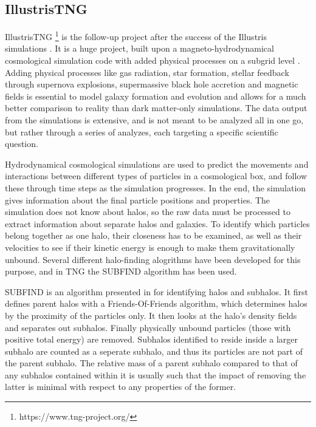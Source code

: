 \subsection{IllustrisTNG}
IllustrisTNG \footnote{https://www.tng-project.org/} is the follow-up project after the success of the Illustris simulations \parencite{Springel2017, Pillepich2017,Naiman2018, Nelson2017, Marinacci2018}. It is a huge project, built upon a magneto-hydrodynamical cosmological simulation code with added physical processes on a subgrid level \parencite{Weinberger2016}. Adding physical processes like gas radiation, star formation, stellar feedback through supernova explosions, supermassive black hole accretion and magnetic fields is essential to model galaxy formation and evolution and allows for a much better comparison to reality than dark matter-only simulations. The data output from the simulations is extensive, and is not meant to be analyzed all in one go, but rather through a series of analyzes, each targeting a specific scientific question. 

Hydrodynamical cosmological simulations are used to predict the movements and interactions between different types of particles in a cosmological box, and follow these through time steps as the simulation progresses. In the end, the simulation gives information about the final particle positions and properties. The simulation does not know about halos, so the raw data must be processed to extract information about separate halos and galaxies. To identify which particles belong together as one halo, their closeness has to be examined, as well as their velocities to see if their kinetic energy is enough to make them gravitationally unbound. Several different halo-finding alogrithms have been developed for this purpose, and in TNG the SUBFIND algorithm has been used.

SUBFIND is an algorithm presented in \textcite{Springel2001} for identifying halos and subhalos. It first defines parent halos with a Friends-Of-Friends algorithm, which determines halos by the proximity of the particles only. It then looks at the halo's density fields and separates out subhalos. Finally physically unbound particles (those with positive total energy) are removed. Subhalos identified to reside inside a larger subhalo are counted as a seperate subhalo, and thus its particles are not part of the parent subhalo. The relative mass of a parent subhalo compared to that of any subhalos contained within it is usually such that the impact of removing the latter is minimal with respect to any properties of the former.


